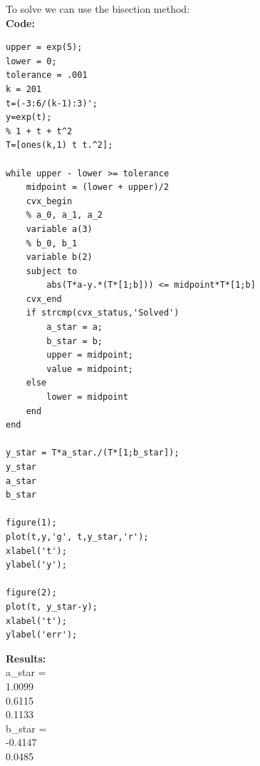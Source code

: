 \documentclass[12pt]{article}
\begin{document}
To solve we can use the bisection method:\\ 
\textbf{Code:}
\begin{lstlisting}
upper = exp(5);
lower = 0;
tolerance = .001
k = 201
t=(-3:6/(k-1):3)';
y=exp(t);
% 1 + t + t^2
T=[ones(k,1) t t.^2];

while upper - lower >= tolerance
    midpoint = (lower + upper)/2
    cvx_begin
    % a_0, a_1, a_2
    variable a(3)
    % b_0, b_1
    variable b(2)
    subject to
        abs(T*a-y.*(T*[1;b])) <= midpoint*T*[1;b]
    cvx_end
    if strcmp(cvx_status,'Solved')
        a_star = a;
        b_star = b;
        upper = midpoint;
        value = midpoint;
    else
        lower = midpoint       
    end
end

y_star = T*a_star./(T*[1;b_star]);
y_star
a_star
b_star

figure(1);
plot(t,y,'g', t,y_star,'r');
xlabel('t');
ylabel('y');

figure(2);
plot(t, y_star-y);
xlabel('t');
ylabel('err');
\end{lstlisting}
\textbf{Results:}\\
a_star =\\
    1.0099\\
    0.6115\\
    0.1133\\
b\_star =\\
   -0.4147\\
    0.0485\\
\end{document}
